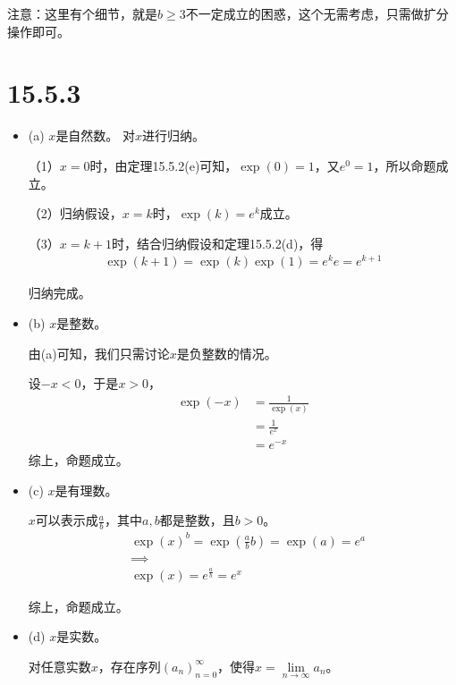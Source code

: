 \documentclass{article}
\begin{document}
注意：这里有个细节，就是$b \geq 3$不一定成立的困惑，这个无需考虑，只需做扩分操作即可。

\section*{15.5.3}

\begin{itemize}
  \item (a) $x$是自然数。
        对$x$进行归纳。

        （1）$x = 0$时，由定理15.5.2(e)可知，$\exp(0) = 1$，又$e^0 = 1$，所以命题成立。

        （2）归纳假设，$x = k$时，$\exp(k) = e^k$成立。

        （3）$x = k + 1$时，结合归纳假设和定理15.5.2(d)，得
        \begin{align*}
          \exp(k + 1) = \exp(k)\exp(1) = e^k e = e^{k + 1}
        \end{align*}

        归纳完成。

  \item (b) $x$是整数。

        由(a)可知，我们只需讨论$x$是负整数的情况。

        设$-x < 0$，于是$x > 0$，
        \begin{align*}
          \exp(-x) & = \frac{1}{\exp(x)} \\
                   & = \frac{1}{e^x}     \\
                   & = e^{-x}
        \end{align*}
        综上，命题成立。

  \item (c) $x$是有理数。

        $x$可以表示成$\frac{a}{b}$，其中$a, b$都是整数，且$b > 0$。
        \begin{align*}
           & \exp(x)^b = \exp(\frac{a}{b}b) = \exp(a) = e^a \\
           & \implies                                       \\
           & \exp(x) = e^{\frac{a}{b}} = e^x
        \end{align*}

        综上，命题成立。

  \item (d) $x$是实数。

        对任意实数$x$，存在序列$(a_n)_{n = 0}^\infty$，使得$x = \lim\limits_{n \to \infty} a_n$。


\end{itemize}
\end{document}
